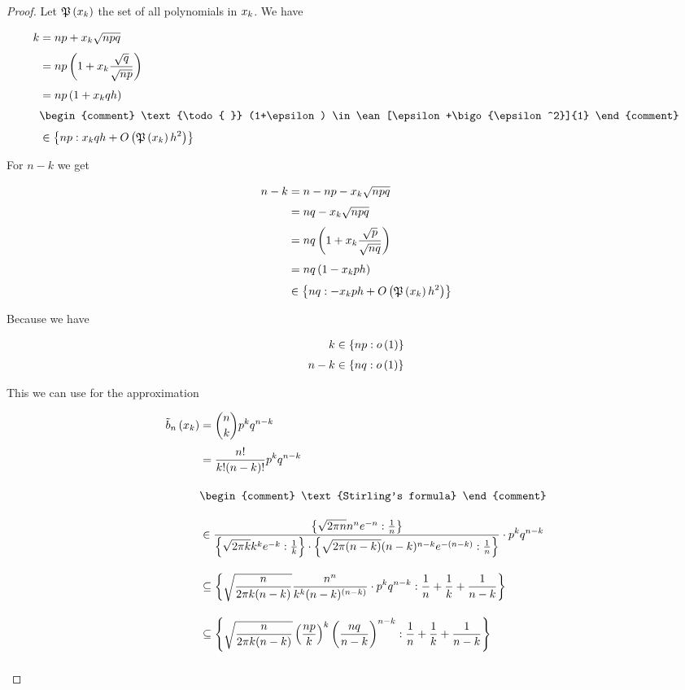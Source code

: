 \begin{proof}
  Let $\mathfrak P\left( {x_{k}} \right)$ the set of all polynomials in $x_{k}$. We have

  \begin{align}
    k &= np + \x \sqrt{npq} \nl
    &= np \left( 1 + \x \frac{\sqrt{q}}{\sqrt{np}}\right) \nl
    &= np \left( 1 + \x q h\right) \nl
    &
    \begin{comment}
      \text{\todo{ }} (1+\epsilon) \in \ean[\epsilon+\bigo{\epsilon^2}]{1}
    \end{comment} \nl
    &\in \ean[\x qh + \bigo{\pol{\x }h^2}]{np}
  \end{align}

  \noindent For $n-k$ we get

  \begin{align}
    n-k &= n-np-\x\sqrt{npq} \nl
    &= nq -\x \sqrt{npq} \nl
    &= nq \left( 1 + \x \frac{\sqrt p}{\sqrt{nq}}\right) \nl
    &= nq \left( 1 - \x p h\right) \nl
    &\in \ean[-\x ph + \bigo{\pol{\x} h^2}]{nq}
  \end{align}


  Because  we have

  \begin{align}
    k & \in \ean[\littleo{1}]{np} \nl
    n-k & \in \ean[\littleo{1}]{nq}
  \end{align}

  \noindent This we can use for the approximation

  \begin{align}
    \bb{\x} &= \binom nk p^k q^{n-k} \nl
    &= \frac{n!}{k!(n-k)!} p^k q^{n-k} \bnl
    & \begin{comment} \text{Stirling's formula} \end{comment} \bnl
    &\in \frac{\ean[\frac 1n]{\sqrt{2\pi n}n^n e^{-n}}}{\ean[\frac 1k]{\sqrt{2\pi k}k^k e^{-k}}\cdot \ean[\frac 1n]{\sqrt{2\pi (n-k)}(n-k)^{n-k} e^{-(n-k)}}} \cdot p^k q^{n-k} \bnl
    & \subseteq \ean[\frac 1n + \frac 1k + \frac 1{n-k}]{\sqrt{\frac{n}{2\pi k (n-k)}} \frac{n^n}{k^k(n-k)^{(n-k)}}\cdot p^k q^{n-k}} \bnl
    & \subseteq \ean[\frac 1n + \frac 1k + \frac 1{n-k}]{\sqrt{\frac{n}{2\pi k (n-k)}} \left(\frac{np}{k}\right)^k \left(\frac{nq}{n-k}\right)^{n-k}} \bnl
  \end{align}


\end{proof}
